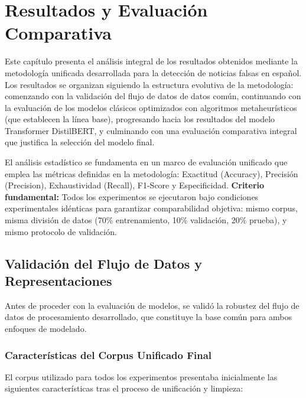 \chapter{Resultados y Evaluación Comparativa \label{cap:AnalisisDeResultados}}

Este capítulo presenta el análisis integral de los resultados obtenidos mediante la metodología unificada desarrollada para la detección de noticias falsas en español. Los resultados se organizan siguiendo la estructura evolutiva de la metodología: comenzando con la validación del flujo de datos de datos común, continuando con la evaluación de los modelos clásicos optimizados con algoritmos metaheurísticos (que establecen la línea base), progresando hacia los resultados del modelo Transformer DistilBERT, y culminando con una evaluación comparativa integral que justifica la selección del modelo final.

El análisis estadístico se fundamenta en un marco de evaluación unificado que emplea las métricas definidas en la metodología: Exactitud (Accuracy), Precisión (Precision), Exhaustividad (Recall), F1-Score y Especificidad. \textbf{Criterio fundamental:} Todos los experimentos se ejecutaron bajo condiciones experimentales idénticas para garantizar comparabilidad objetiva: mismo corpus, misma división de datos (70\% entrenamiento, 10\% validación, 20\% prueba), y mismo protocolo de validación.

\section{Validación del Flujo de Datos y Representaciones}
\label{sec:validacion_pipeline_datos}

Antes de proceder con la evaluación de modelos, se validó la robustez del flujo de datos de procesamiento desarrollado, que constituye la base común para ambos enfoques de modelado.

\subsection{Características del Corpus Unificado Final}

El corpus utilizado para todos los experimentos presentaba inicialmente las siguientes características tras el proceso de unificación y limpieza:

